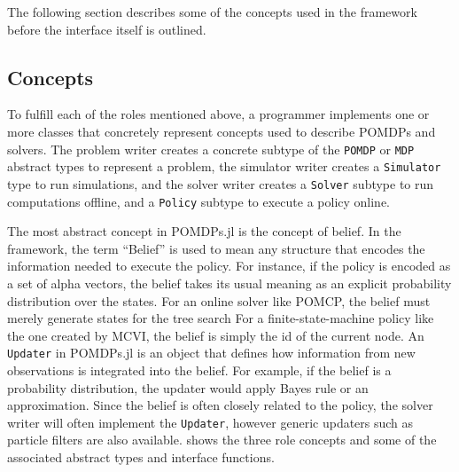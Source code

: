 The following section describes some of the concepts used in the framework before the interface itself is outlined.

\subsection{Concepts} \label{sec:concepts}

To fulfill each of the roles mentioned above, a programmer implements one or more classes that concretely represent concepts used to describe POMDPs and solvers.
The problem writer creates a concrete subtype of the \texttt{POMDP} or \texttt{MDP} abstract types to represent a problem, the simulator writer creates a \texttt{Simulator} type to run simulations, and the solver writer creates a \texttt{Solver} subtype to run computations offline, and a \texttt{Policy} subtype to execute a policy online.

The most abstract concept in POMDPs.jl is the concept of belief.
In the framework, the term ``Belief'' is used to mean any structure that encodes the information needed to execute the policy.
For instance, if the policy is encoded as a set of alpha vectors, the belief takes its usual meaning as an explicit probability distribution over the states.
For an online solver like POMCP, the belief must merely generate states for the tree search
For a finite-state-machine policy like the one created by MCVI, the belief is simply the id of the current node.
An \texttt{Updater} in POMDPs.jl is an object that defines how information from new observations is integrated into the belief.
For example, if the belief is a probability distribution, the updater would apply Bayes rule or an approximation.
Since the belief is often closely related to the policy, the solver writer will often implement the \texttt{Updater}, however generic updaters such as particle filters are also available.
 shows the three role concepts and some of the associated abstract types and interface functions.

